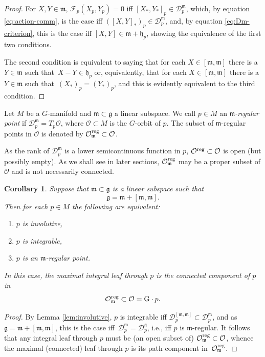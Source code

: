 \documentclass[10pt,a4paper]{amsart}
\numberwithin{equation}{section}
\newtheorem{Corollary}[Theorem]{Corollary}
\newcommand{\be}{\begin{equation}}
\newcommand{\ee}{\end{equation}}
\newcommand{\ocal}{\mathcal{O}}
\newcommand{\dcal}{\mathcal{D}}
\newcommand{\m}{\mathfrak{m}}
\newcommand{\G}{\mathrm{G}}
\newcommand{\g}{{\mathfrak{g}}}
\newcommand{\h}{{\mathfrak h}}
\renewcommand{\m}{{\mathfrak m}}
\begin{document}
\begin{proof}
For $X, Y \in \m$, ${\mathcal F}_p(X_p, Y_p) = 0$ iff $[X_\ast, Y_\ast]_p \in \dcal^\m_p$, which, by equation \eqref{eq:action-comm}, is the case iff $([X, Y]_\ast)_p \in \dcal^\m_p$, and, by equation \eqref{eq:Dm-criterion}, this is the case iff $[X,Y] \in \m + \h_p$, showing the equivalence of the first two conditions.

The second condition is equivalent to saying that for each $X \in [\m,\m]$ there is a $Y \in \m$ such that~$X - Y \in \h_p$ or, equivalently, that for each $X \in [\m,\m]$ there is a $Y \in \m$ such that~$(X_\ast)_p = (Y_\ast)_p$, and this is evidently equivalent to the third condition.
\end{proof}


\begin{Definition} \label{def:regular}
Let $M$ be a $G$-manifold and $\m \subset \g$ a linear subspace. We call $p \in M$ an {\em $\m$-regular point} if $\dcal^\m_p = T_p\ocal$, where $\ocal \subset M$ is the $G$-orbit of $p$. The subset of $\m$-regular points in $\ocal$ is denoted by
$\ocal^{\rm reg}_{\m} \subset \ocal$.
\end{Definition}

As the rank of $\dcal^\m_p$ is a lower semicontinuous function in $p$, $\ocal^{\rm reg} \subset \ocal$ is open (but possibly empty).
As we shall see in later sections, $\ocal^{\rm reg}_{\m}$ may be a proper subset of $\ocal$ and is not necessarily connected.

\begin{Corollary} \label{cor:integrable}
Suppose that $\m \subset \g$ is a linear subspace such that
\be \label{eq:condition-integrable}
\g = \m + [\m,\m].
\ee
Then for each $p \in M$ the following are equivalent:
\begin{enumerate}\itemsep=0pt
\item[$(1)$] $p$ is involutive,
\item[$(2)$] $p$ is integrable,
\item[$(3)$] $p$ is an $\m$-regular point.
\end{enumerate}
In this case, the maximal integral leaf through $p$ is the connected component of $p$ in
\[
\ocal^{\rm reg}_{\m}  \subset \ocal  =  \G \cdot p.
\]
\end{Corollary}

\begin{proof}
By Lemma \ref{lem:involutive}, $p$ is integrable iff $\dcal^{[\m, \m]}_p \subset \dcal^\m_p$, and as $\g = \m + [\m,\m]$, this is the case iff~$\dcal^\m_p = \dcal^\g_p$, i.e., iff $p$ is $\m$-regular. It follows that any integral leaf through $p$ must be (an open subset of) $\ocal^{\rm reg}_{\m} \subset \ocal$, whence the maximal (connected) leaf through $p$ is its path component in~$\ocal^{\rm reg}_{\m}$.
\end{proof}
\end{document}
